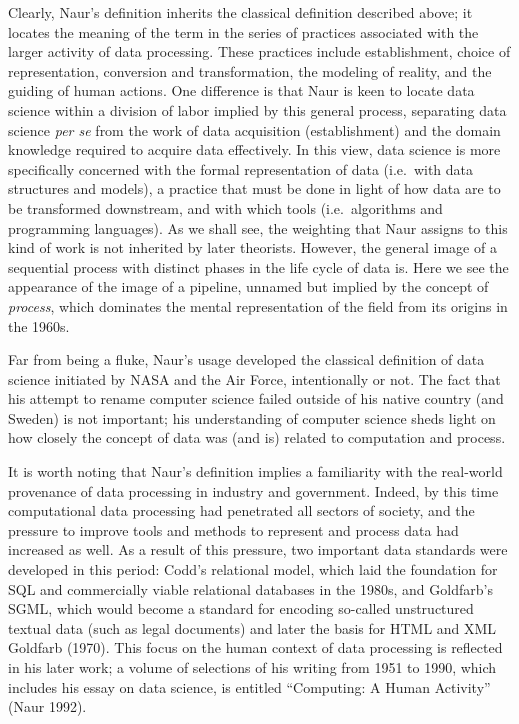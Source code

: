 \documentclass[
  letterpaper,
]{report}
\begin{document}
Clearly, Naur's definition inherits the classical definition described
above; it locates the meaning of the term in the series of practices
associated with the larger activity of data processing. These practices
include establishment, choice of representation, conversion and
transformation, the modeling of reality, and the guiding of human
actions. One difference is that Naur is keen to locate data science
within a division of labor implied by this general process, separating
data science \emph{per se} from the work of data acquisition
(establishment) and the domain knowledge required to acquire data
effectively. In this view, data science is more specifically concerned
with the formal representation of data (i.e.~with data structures and
models), a practice that must be done in light of how data are to be
transformed downstream, and with which tools (i.e.~algorithms and
programming languages). As we shall see, the weighting that Naur assigns
to this kind of work is not inherited by later theorists. However, the
general image of a sequential process with distinct phases in the life
cycle of data is. Here we see the appearance of the image of a pipeline,
unnamed but implied by the concept of \emph{process}, which dominates
the mental representation of the field from its origins in the 1960s.

Far from being a fluke, Naur's usage developed the classical definition
of data science initiated by NASA and the Air Force, intentionally or
not. The fact that his attempt to rename computer science failed outside
of his native country (and Sweden) is not important; his understanding
of computer science sheds light on how closely the concept of data was
(and is) related to computation and process.

It is worth noting that Naur's definition implies a familiarity with the
real-world provenance of data processing in industry and government.
Indeed, by this time computational data processing had penetrated all
sectors of society, and the pressure to improve tools and methods to
represent and process data had increased as well. As a result of this
pressure, two important data standards were developed in this period:
Codd's relational model, which laid the foundation for SQL and
commercially viable relational databases in the 1980s, and Goldfarb's
SGML, which would become a standard for encoding so-called unstructured
textual data (such as legal documents) and later the basis for HTML and
XML Goldfarb (1970). This focus on the human context of data processing
is reflected in his later work; a volume of selections of his writing
from 1951 to 1990, which includes his essay on data science, is entitled
``Computing: A Human Activity'' (Naur 1992).
\end{document}
